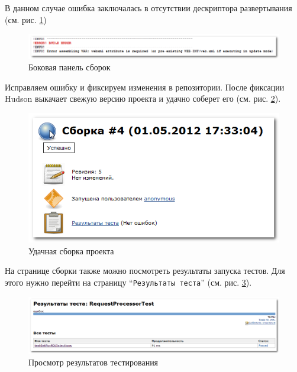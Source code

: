 \documentclass[a4paper,12pt]{article}
\begin{document}
В данном случае ошибка заключалась в отсутствии дескриптора развертывания (см. рис. \ref{pic.hudson.console})

\begin{figure}[htp]
\begin{center}
  \includegraphics[scale = 0.7]{job-4.png}
  \caption[labelInTOC]{Боковая панель сборок}
  \label{pic.hudson.console}
\end{center}
\end{figure}

Исправляем ошибку и фиксируем изменения в репозитории. После фиксации Hudson выкачает свежую версию проекта и удачно
соберет его (см. рис. \ref{pic.hudson.build-successful}).

\begin{figure}[htp]
\begin{center}
  \includegraphics[scale = 0.6]{job-5.png}
  \caption[labelInTOC]{Удачная сборка проекта}
  \label{pic.hudson.build-successful}
\end{center}
\end{figure}


На странице сборки также можно посмотреть результаты запуска тестов. Для этого нужно перейти на страницу
``\texttt{Результаты теста}'' (см. рис. \ref{pic.hudson.test}).

\begin{figure}[htp]
\begin{center}
  \includegraphics[scale = 0.6]{job-6.png}
  \caption[labelInTOC]{Просмотр результатов тестирования}
  \label{pic.hudson.test}
\end{center}
\end{figure}
\end{document}
